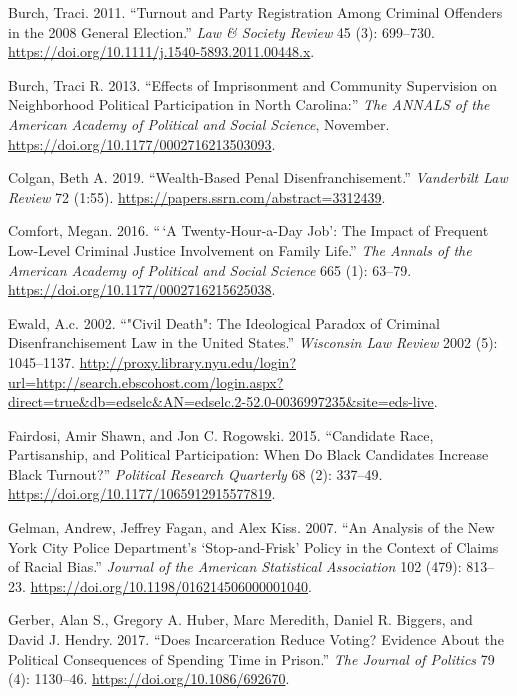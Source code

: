 \documentclass[
  12pt,
]{article}
\newlength{\cslhangindent}
\newenvironment{cslreferences}%
  {\setlength{\parindent}{0pt}%
  \everypar{\setlength{\hangindent}{\cslhangindent}}\ignorespaces}%
  {\par}
\begin{document}
\begin{cslreferences}
\leavevmode\hypertarget{ref-Burch2011}{}%
Burch, Traci. 2011. ``Turnout and Party Registration Among Criminal Offenders in the 2008 General Election.'' \emph{Law \& Society Review} 45 (3): 699--730. \url{https://doi.org/10.1111/j.1540-5893.2011.00448.x}.

\leavevmode\hypertarget{ref-Burch2013}{}%
Burch, Traci R. 2013. ``Effects of Imprisonment and Community Supervision on Neighborhood Political Participation in North Carolina:'' \emph{The ANNALS of the American Academy of Political and Social Science}, November. \url{https://doi.org/10.1177/0002716213503093}.

\leavevmode\hypertarget{ref-Colgan2019}{}%
Colgan, Beth A. 2019. ``Wealth-Based Penal Disenfranchisement.'' \emph{Vanderbilt Law Review} 72 (1:55). \url{https://papers.ssrn.com/abstract=3312439}.

\leavevmode\hypertarget{ref-Comfort2016}{}%
Comfort, Megan. 2016. ``\,`A Twenty-Hour-a-Day Job': The Impact of Frequent Low-Level Criminal Justice Involvement on Family Life.'' \emph{The Annals of the American Academy of Political and Social Science} 665 (1): 63--79. \url{https://doi.org/10.1177/0002716215625038}.

\leavevmode\hypertarget{ref-Ewald2002}{}%
Ewald, A.c. 2002. ``"Civil Death": The Ideological Paradox of Criminal Disenfranchisement Law in the United States.'' \emph{Wisconsin Law Review} 2002 (5): 1045--1137. \url{http://proxy.library.nyu.edu/login?url=http://search.ebscohost.com/login.aspx?direct=true\&db=edselc\&AN=edselc.2-52.0-0036997235\&site=eds-live}.

\leavevmode\hypertarget{ref-Fairdosi2015}{}%
Fairdosi, Amir Shawn, and Jon C. Rogowski. 2015. ``Candidate Race, Partisanship, and Political Participation: When Do Black Candidates Increase Black Turnout?'' \emph{Political Research Quarterly} 68 (2): 337--49. \url{https://doi.org/10.1177/1065912915577819}.

\leavevmode\hypertarget{ref-Gelman2007}{}%
Gelman, Andrew, Jeffrey Fagan, and Alex Kiss. 2007. ``An Analysis of the New York City Police Department's `Stop-and-Frisk' Policy in the Context of Claims of Racial Bias.'' \emph{Journal of the American Statistical Association} 102 (479): 813--23. \url{https://doi.org/10.1198/016214506000001040}.

\leavevmode\hypertarget{ref-Gerber2017}{}%
Gerber, Alan S., Gregory A. Huber, Marc Meredith, Daniel R. Biggers, and David J. Hendry. 2017. ``Does Incarceration Reduce Voting? Evidence About the Political Consequences of Spending Time in Prison.'' \emph{The Journal of Politics} 79 (4): 1130--46. \url{https://doi.org/10.1086/692670}.


\end{cslreferences}
\end{document}
